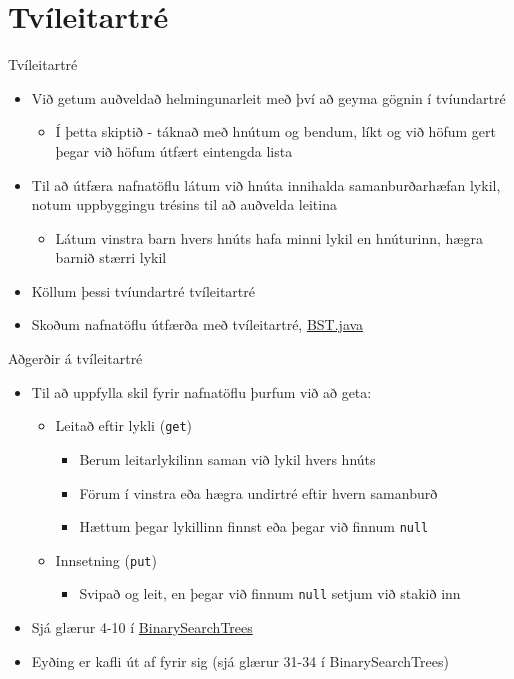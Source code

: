 \documentclass{beamer}
\begin{document}
\section{Tvíleitartré}

\begin{frame}{Tvíleitartré}
\begin{itemize}
 \item Við getum auðveldað helmingunarleit með því að geyma gögnin í tvíundartré
 \begin{itemize}
  \item Í þetta skiptið - táknað með hnútum og bendum, líkt og við höfum gert þegar við höfum útfært eintengda lista
 \end{itemize}
 \item Til að útfæra nafnatöflu látum við hnúta innihalda samanburðarhæfan lykil, notum uppbyggingu trésins til að auðvelda leitina
 \begin{itemize}
  \item Látum vinstra barn hvers hnúts hafa minni lykil en hnúturinn, hægra barnið stærri lykil
 \end{itemize}
 \item Köllum þessi tvíundartré tvíleitartré 
 \item Skoðum nafnatöflu útfærða með tvíleitartré, \href{http://algs4.cs.princeton.edu/code/edu/princeton/cs/algs4/BST.java.html}{BST.java}
\end{itemize}
\end{frame}

\begin{frame}{Aðgerðir á tvíleitartré}
\begin{itemize}
 \item Til að uppfylla skil fyrir nafnatöflu þurfum við að geta:
 \begin{itemize}
  \item Leitað eftir lykli (\texttt{get})
  \begin{itemize}
   \item Berum leitarlykilinn saman við lykil hvers hnúts
   \item Förum í vinstra eða hægra undirtré eftir hvern samanburð
   \item Hættum þegar lykillinn finnst eða þegar við finnum \texttt{null}
  \end{itemize}
  \item Innsetning (\texttt{put})
  \begin{itemize}
   \item Svipað og leit, en þegar við finnum \texttt{null} setjum við stakið inn
  \end{itemize}
 \end{itemize}
 \item Sjá glærur 4-10 í \href{http://algs4.cs.princeton.edu/lectures/32BinarySearchTrees.pdf}{BinarySearchTrees}
 \item Eyðing er kafli út af fyrir sig (sjá glærur 31-34 í BinarySearchTrees)
\end{itemize}
\end{frame}
\end{document}
